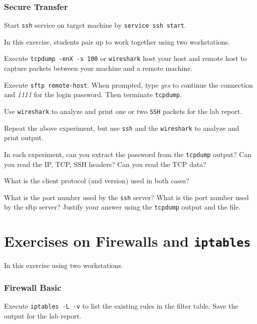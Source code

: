 \documentclass{../UTNetLab}
\begin{document}
\section{Secure Transfer}
    Start \lstinline{ssh} service on target machine by \lstinline{service ssh start}.

        In this exercise, students pair up to work together using two workstations.
    
    Execute \lstinline{tcpdump -enX -s 100} or \lstinline{wireshark} host your host and remote host to capture packets between your machine and a remote machine.

    Execute \lstinline[emph={your-host, remote-host}]{sftp remote-host}. When prompted, type \textit{yes} to continue the connection and \textit{1111} for the login password. Then terminate \lstinline{tcpdump}.

    Use \lstinline{wireshark} to analyze and print one or two \lstinline{SSH} packets for the lab report.

    Repeat the above experiment, but use \lstinline{ssh} and the \lstinline{wireshark} to analyze and print output.

    \begin{report}
    \item In each experiment, can you extract the password from the \lstinline{tcpdump} output? Can you read the IP, TCP, SSH headers? Can you read the TCP data?
    
    \item What is the client protocol (and version) used in both cases?
    
    \item What is the port number used by the \lstinline{ssh} server? What is the port number used by the sftp server? Justify your answer using the \lstinline{tcpdump} output and the  file.
    \end{report}

\part{Exercises on Firewalls and \texttt{iptables}}
    In this exercise using two workstations.

\section{Firewall Basic}
    Execute \lstinline{iptables -L -v} to list the existing rules in the filter table. Save the output for the lab report.
\end{document}
